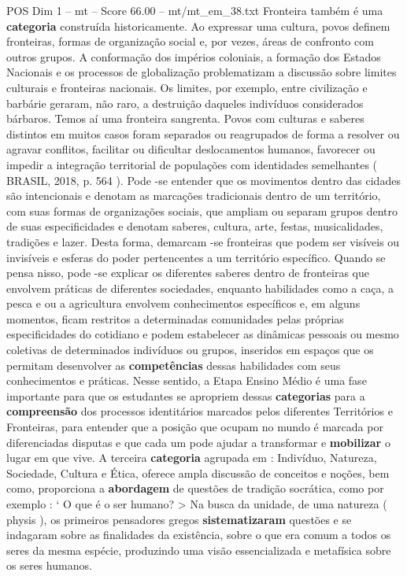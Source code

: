 \begin{textsample}{POS Dim 1 – mt – Score 66.00 – mt/mt\_em\_38.txt}
Fronteira também é uma \textbf{categoria} construída historicamente.
Ao expressar uma cultura, povos definem fronteiras, formas de organização social e, por vezes, áreas de confronto com outros grupos.
A conformação dos impérios coloniais, a formação dos Estados Nacionais e os processos de globalização problematizam a discussão sobre limites culturais e fronteiras nacionais.
Os limites, por exemplo, entre civilização e barbárie geraram, não raro, a destruição daqueles indivíduos considerados bárbaros.
Temos aí uma fronteira sangrenta.
Povos com culturas e saberes distintos em muitos casos foram separados ou reagrupados de forma a resolver ou agravar conflitos, facilitar ou dificultar deslocamentos humanos, favorecer ou impedir a integração territorial de populações com identidades semelhantes ( BRASIL, 2018, p. 564 ).
Pode -se entender que os movimentos dentro das cidades são intencionais e denotam as marcações tradicionais dentro de um território, com suas formas de organizações sociais, que ampliam ou separam grupos dentro de suas especificidades e denotam saberes, cultura, arte, festas, musicalidades, tradições e lazer.
Desta forma, demarcam -se fronteiras que podem ser visíveis ou invisíveis e esferas do poder pertencentes a um território específico.
Quando se pensa nisso, pode -se explicar os diferentes saberes dentro de fronteiras que envolvem práticas de diferentes sociedades, enquanto habilidades como a caça, a pesca e ou a agricultura envolvem conhecimentos específicos e, em alguns momentos, ficam restritos a determinadas comunidades pelas próprias especificidades do cotidiano e podem estabelecer as dinâmicas pessoais ou mesmo coletivas de determinados indivíduos ou grupos, inseridos em espaços que os permitam desenvolver as \textbf{competências} dessas habilidades com seus conhecimentos e práticas.
Nesse sentido, a Etapa Ensino Médio é uma fase importante para que os estudantes se apropriem dessas \textbf{categorias} para a \textbf{compreensão} dos processos identitários marcados pelos diferentes Territórios e Fronteiras, para entender que a posição que ocupam no mundo é marcada por diferenciadas disputas e que cada um pode ajudar a transformar e \textbf{mobilizar} o lugar em que vive.
A terceira \textbf{categoria} agrupada em : Indivíduo, Natureza, Sociedade, Cultura e Ética, oferece ampla discussão de conceitos e noções, bem como, proporciona a \textbf{abordagem} de questões de tradição socrática, como por exemplo : ‘ O que é o ser humano? > Na busca da unidade, de uma natureza ( physis ), os primeiros pensadores gregos \textbf{sistematizaram} questões e se indagaram sobre as finalidades da existência, sobre o que era comum a todos os seres da mesma espécie, produzindo uma visão essencializada e metafísica sobre os seres humanos.

\end{textsample}
